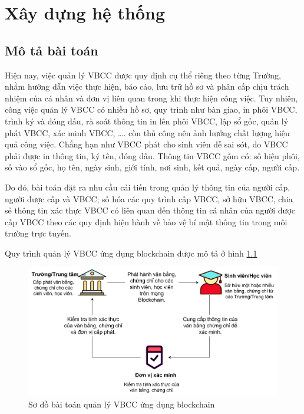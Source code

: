 \chapter{Xây dựng hệ thống}

\section{Mô tả bài toán}

Hiện nay, việc quản lý VBCC được quy định cụ thể riêng theo từng Trường, nhằm hướng dẫn việc thực hiện, báo cáo, lưu trữ hồ sơ và phân cấp chịu trách nhiệm của cá nhân và đơn vị liên quan trong khi thực hiện công việc.
Tuy nhiên, công việc quản lý VBCC có nhiều hồ sơ, quy trình như bàn giao, in phôi VBCC, trình ký và đóng dấu, rà soát thông tin in lên phôi VBCC, lập sổ gốc, quản lý phát VBCC, xác minh VBCC, \ldots. còn thủ công nên ảnh hưởng chất lượng hiệu quả công việc.
Chẳng hạn như VBCC phát cho sinh viên dễ sai sót, do VBCC phải được in thông tin, ký tên, đóng dấu. Thông tin VBCC gồm có: số hiệu phôi, số vào sổ gốc, họ tên, ngày sinh, giới tính, nơi sinh, kết quả, ngày cấp, người cấp. 

Do đó, bài toán đặt ra nhu cầu cải tiến trong quản lý thông tin của người cấp, người được cấp và VBCC; số hóa các quy trình cấp VBCC, sở hữu VBCC, chia sẻ thông tin xác thực VBCC có liên quan đến thông tin cá nhân của người được cấp VBCC theo các quy định hiện hành về bảo vệ bí mật thông tin trong môi trường trực tuyến.

Quy trình quản lý VBCC ứng dụng blockchain được mô tả ở hình \ref{fig:vbcc}

\begin{figure}[htbp]
\centering
\includegraphics[width=.9\linewidth]{img/vbcc.jpg}
\caption{Sơ đồ bài toán quản lý VBCC ứng dụng blockchain}
\label{fig:vbcc}
\end{figure}

